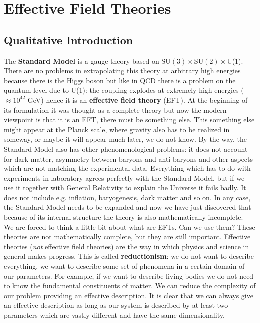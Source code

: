 \documentclass[../main.tex]{subfiles}
\begin{document}
\setchapterpreamble[u]{\margintoc}
\chapter[Effective Field Theories]{Effective Field Theories\footnotemark[0]}
\section{Qualitative Introduction}
The \textbf{Standard Model} is a gauge theory based on SU$(3)\times$SU$(2)\times$U(1). There are no problems in extrapolating this theory at arbitrary high energies because there is the Higgs boson but like in QCD there is a problem on the quantum level due to U(1): the coupling explodes at extremely high energies ($\approx10^{42}$ GeV) hence it is an \textbf{effective field theory} (EFT). At the beginning of its formulation it was thought as a complete theory but now the modern viewpoint is that it is an EFT, there must be something else. This something else might appear at the Planck scale, where gravity also has to be realized in someway, or maybe it will appear much later, we do not know. By the way, the Standard Model also has other phenomenological problems: it does not account for dark matter, asymmetry between baryons and anti-baryons and other aspects which are not matching the experimental data. Everything which has to do with experiments in laboratory agrees perfectly with the Standard Model, but if we use it together with General Relativity to explain the Universe it fails badly. It does not include e.g. inflation, baryogenesis, dark matter and so on. In any case, the Standard Model needs to be expanded and now we have just discovered that because of its internal structure the theory is also mathematically incomplete.\\ 
We are forced to think a little bit about what are EFTs. Can we use them? These theories are not mathematically complete, but they are still important. Effective theories (\textit{not} effective field theories) are the way in which physics and science in general makes progress. This is called \textbf{reductionism}: we do not want to describe everything, we want to describe some set of phenomena in a certain domain of our parameters. For example, if we want to describe living bodies we do not need to know the fundamental constituents of matter. We can reduce the complexity of our problem providing an effective description. It is clear that we can always give an effective description as long as our system is described by at least two parameters which are vastly different and have the same dimensionality. 
\end{document}
